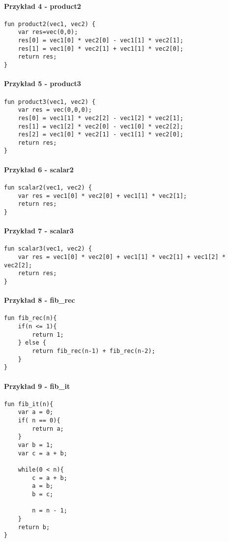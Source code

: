\documentclass[11pt]{article} %
\begin{document}
\paragraph{Przykład 4 - product2}
\begin{verbatim}
fun product2(vec1, vec2) {
    var res=vec(0,0);
    res[0] = vec1[0] * vec2[0] - vec1[1] * vec2[1];
    res[1] = vec1[0] * vec2[1] + vec1[1] * vec2[0];
    return res;
}
\end{verbatim}

\paragraph{Przykład 5 - product3}
\begin{verbatim}
fun product3(vec1, vec2) {
    var res = vec(0,0,0);
    res[0] = vec1[1] * vec2[2] - vec1[2] * vec2[1];
    res[1] = vec1[2] * vec2[0] - vec1[0] * vec2[2];
    res[2] = vec1[0] * vec2[1] - vec1[1] * vec2[0];
    return res;
}
\end{verbatim}

\paragraph{Przykład 6 - scalar2}
\begin{verbatim}
fun scalar2(vec1, vec2) {
    var res = vec1[0] * vec2[0] + vec1[1] * vec2[1];
    return res;
}
\end{verbatim}

\paragraph{Przykład 7 - scalar3}
\begin{verbatim}
fun scalar3(vec1, vec2) {
    var res = vec1[0] * vec2[0] + vec1[1] * vec2[1] + vec1[2] * vec2[2];
    return res;
}
\end{verbatim}

\paragraph{Przykład 8 - fib\_rec}
\begin{verbatim}
fun fib_rec(n){
    if(n <= 1){
        return 1;
    } else {
        return fib_rec(n-1) + fib_rec(n-2);
    }
}
\end{verbatim}

\paragraph{Przykład 9 - fib\_it}
\begin{verbatim}
fun fib_it(n){
    var a = 0;
    if( n == 0){
        return a;
    }
    var b = 1;
    var c = a + b;

    while(0 < n){
        c = a + b;
        a = b;
        b = c;

        n = n - 1;
    }
    return b;
}
\end{verbatim}
\end{document}
